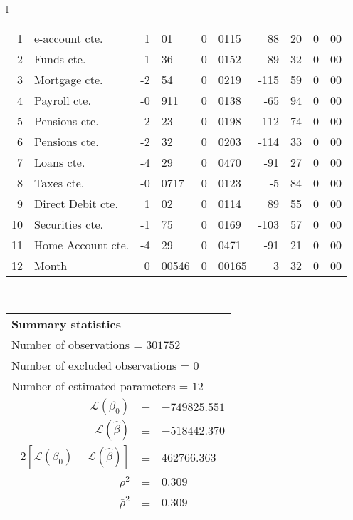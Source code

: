 \begin{tabular}{l}
\begin{tabular}{rlr@{.}lr@{.}lr@{.}lr@{.}l}
1 & e-account cte. & 1&01 & 0&0115 & 88&20 & 0&00\\
2 & Funds cte. & -1&36 & 0&0152 & -89&32 & 0&00\\
3 & Mortgage cte. & -2&54 & 0&0219 & -115&59 & 0&00\\
4 & Payroll cte. & -0&911 & 0&0138 & -65&94 & 0&00\\
5 & Pensions cte. & -2&23 & 0&0198 & -112&74 & 0&00\\
6 & Pensions cte. & -2&32 & 0&0203 & -114&33 & 0&00\\
7 & Loans cte. & -4&29 & 0&0470 & -91&27 & 0&00\\
8 & Taxes cte. & -0&0717 & 0&0123 & -5&84 & 0&00\\
9 & Direct Debit cte. & 1&02 & 0&0114 & 89&55 & 0&00\\
10 & Securities cte. & -1&75 & 0&0169 & -103&57 & 0&00\\
11 & Home Account cte. & -4&29 & 0&0471 & -91&21 & 0&00\\
12 & Month & 0&00546 & 0&00165 & 3&32 & 0&00\\
\hline
\end{tabular}
\\
\begin{tabular}{rcl}
\multicolumn{3}{l}{\bf Summary statistics}\\
\multicolumn{3}{l}{ Number of observations = $301752$} \\
\multicolumn{3}{l}{ Number of excluded observations = $0$} \\
\multicolumn{3}{l}{ Number of estimated  parameters = $12$} \\
 $\mathcal{L}(\beta_0)$ &=&  $-749825.551$ \\
 $\mathcal{L}(\hat{\beta})$ &=& $-518442.370 $  \\
 $-2[\mathcal{L}(\beta_0) -\mathcal{L}(\hat{\beta})]$ &=& $462766.363$ \\
    $\rho^2$ &=&   $0.309$ \\
    $\bar{\rho}^2$ &=&    $0.309$ \\
\end{tabular}
  \end{tabular}
